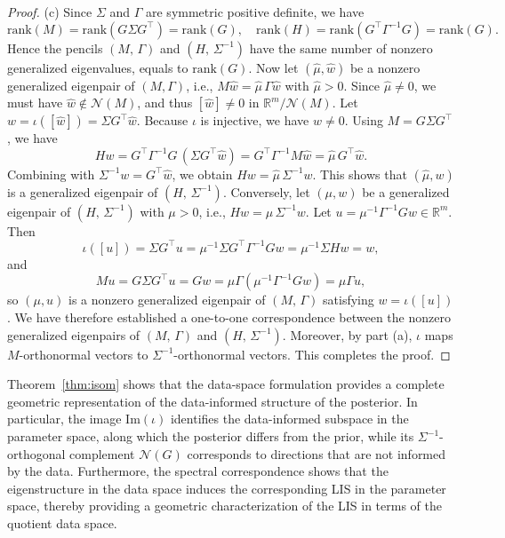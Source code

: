 \documentclass[]{myarticle}
\begin{document}
\begin{proof}
  (c) Since $\Sigma$ and $\Gamma$ are symmetric positive definite, we have
  \[\mathrm{rank}(M)=\mathrm{rank}(G\Sigma G^\top)=\mathrm{rank}(G), \quad
  \mathrm{rank}(H)=\mathrm{rank}(G^\top\Gamma^{-1}G)=\mathrm{rank}(G).\]
  Hence the pencils $(M,\,\Gamma)$ and $(H,\,\Sigma^{-1})$ have the same number of nonzero generalized eigenvalues, equals to $\mathrm{rank}(G)$. Now let $(\hat\mu,\hat w)$ be a nonzero generalized eigenpair of $(M,\Gamma)$, i.e., $M\hat w=\hat\mu\,\Gamma \hat w$ with $\hat\mu>0$. Since $\hat\mu\neq 0$, we must have $\hat w\notin\mathcal N(M)$, and thus $[\hat w]\neq 0$ in $\mathbb R^m/\mathcal N(M)$. Let $w=\iota([\hat w])=\Sigma G^\top \hat w$. Because $\iota$ is injective, we have $w\neq 0$.
  Using $M=G\Sigma G^\top$, we have
  \[ Hw = G^\top\Gamma^{-1}G\,(\Sigma G^\top \hat w)
  = G^\top\Gamma^{-1}M\hat w = \hat\mu\, G^\top \hat w. \]
  Combining with $\Sigma^{-1}w=G^\top\hat w$, we obtain $Hw=\hat\mu\,\Sigma^{-1}w$. This shows that $(\hat\mu,w)$ is a generalized eigenpair of $(H,\,\Sigma^{-1})$. Conversely, let $(\mu,w)$ be a generalized eigenpair of $(H,\,\Sigma^{-1})$ with $\mu>0$, i.e., $Hw=\mu\,\Sigma^{-1}w$. Let $u=\mu^{-1}\Gamma^{-1}G w\in\mathbb R^m$. Then 
  \[\iota([u])=\Sigma G^\top u = \mu^{-1}\Sigma G^\top\Gamma^{-1}Gw
  =\mu^{-1}\Sigma H w =w,\]
  and 
  \[Mu = G\Sigma G^\top u = Gw = \mu\Gamma(\mu^{-1}\Gamma^{-1}Gw) = \mu\Gamma u,
  \]
  so $(\mu,u)$ is a nonzero generalized eigenpair of $(M,\,\Gamma)$ satisfying $w=\iota([u])$. We have therefore established a one-to-one correspondence between the nonzero generalized eigenpairs of $(M,\,\Gamma)$ and $(H,\,\Sigma^{-1})$. Moreover, by part (a), $\iota$ maps $M$-orthonormal vectors to $\Sigma^{-1}$-orthonormal vectors. This completes the proof.
\end{proof}

\begin{remark}
Theorem~\ref{thm:isom} shows that the data-space formulation provides a complete geometric representation of the data-informed structure of the posterior. In particular, the image $\mathrm{Im}(\iota)$ identifies the data-informed subspace in the parameter space, along which the posterior differs from the prior, while its $\Sigma^{-1}$-orthogonal complement $\mathcal N(G)$ corresponds to directions that are not informed by the data. Furthermore, the spectral correspondence shows that the eigenstructure in the data space induces the corresponding LIS in the parameter space, thereby providing a geometric characterization of the LIS in terms of the quotient data space.
\end{remark}
\end{document}
